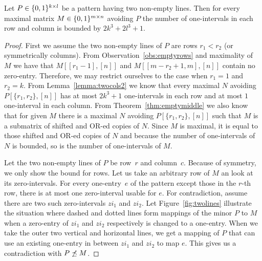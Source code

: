 \begin{lemma}
Let $P\in\{0,1\}^{k\times l}$ be a pattern having two non-empty lines. Then for every maximal matrix $M\in\{0,1\}^{m\times n}$ avoiding $P$ the number of one-intervals in each row and column is bounded by $2k^3+2l^3+1$. 
\end{lemma}
\begin{proof}
First we assume the two non-empty lines of $P$ are rows $r_1<r_2$ (or symmetrically columns). From Observation~\ref{obs:emptyrows} and maximality of $M$ we have that $M[[r_1-1],[n]]$ and $M[[m-r_2+1,m],[n]]$ contain no zero-entry. Therefore, we may restrict ourselves to the case when $r_1=1$ and $r_2=k$. From Lemma~\ref{lemma:twocols2} we know that every maximal $N$ avoiding $P[\{r_1,r_2\},[n]]$ has at most $2k^3+1$ one-intervals in each row and at most $1$ one-interval in each column. From Theorem~\ref{thm:emptymiddle} we also know that for given $M$ there is a maximal $N$ avoiding $P[\{r_1,r_2\},[n]]$ such that $M$ is a submatrix of shifted and OR-ed copies of $N$. Since $M$ is maximal, it is equal to those shifted and OR-ed copies of $N$ and because the number of one-intervals of $N$ is bounded, so is the number of one-intervals of $M$.

Let the two non-empty lines of $P$ be row~$r$ and column~$c$. Because of symmetry, we only show the bound for rows. Let us take an arbitrary row of $M$ an look at its zero-intervals. For every one-entry~$e$ of the pattern except those in the $r$-th row, there is at most one zero-interval usable for $e$. For contradiction, assume there are two such zero-intervals $zi_1$ and $zi_2$. Let Figure~\ref{fig:twolines} illustrate the situation where dashed and dotted lines form mappings of the minor $P$ to $M$ when a zero-entry of $zi_1$ and $zi_2$ respectively is changed to a one-entry. When we take the outer two vertical and horizontal lines, we get a mapping of $P$ that can use an existing one-entry in between $zi_1$ and $zi_2$ to map $e$. This gives us a contradiction with $P\not\preceq M$.


\end{proof}
